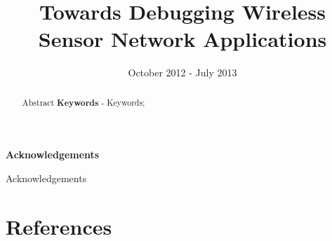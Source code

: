 \documentclass[a4paper]{article}
\title{Towards Debugging Wireless Sensor Network Applications}
\date{October 2012 - July 2013}
\author{}
\makeatletter
\newcommand\ackname{Acknowledgements}
\newenvironment{acknowledgements}{%
      \titlepage
      \null\vfil
      \@beginparpenalty\@lowpenalty
      \begin{center}%
        \bfseries \ackname
        \@endparpenalty\@M
      \end{center}}%
     {\par\vfil\null\endtitlepage}
\newenvironment{acknowledgements}{%
      \if@twocolumn
        \section*{\abstractname}%
      \else
        \small
        \begin{center}%
          {\bfseries \ackname\vspace{-.5em}\vspace{\z@}}%
        \end{center}%
        \quotation
      \fi}
      {\if@twocolumn\else\endquotation\fi}
\makeatother
\begin{document}
\maketitle

\pagestyle{empty}
\thispagestyle{empty}

\newpage

\begin{abstract}
Abstract
\newline
\newline
\noindent \textbf{Keywords} - Keywords;
\end{abstract}
\newpage

\begin{acknowledgements}
Acknowledgements
\end{acknowledgements}
\newpage

\pagestyle{plain}
\setcounter{page}{1}

\tableofcontents
\clearpage

\clearpage

\appendixpage
\addappheadtotoc
\appendix

\section{References}
\renewcommand{\refname}{\vspace{-1cm}}


\end{document}
